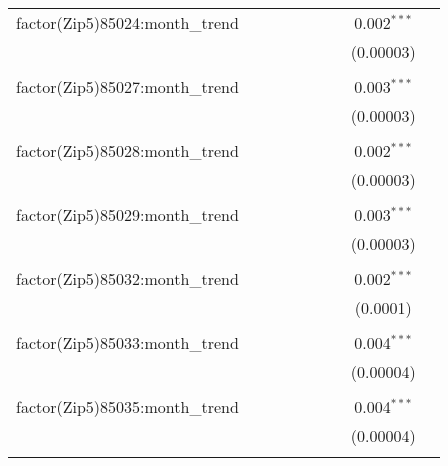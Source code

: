 \begin{table}[H]
{\begin{tabular}{@{\extracolsep{5pt}}lcccccccc}
  factor(Zip5)85024:month\_trend &  &  &  &  &  &  & 0.002$^{***}$ &  \\  

   &  &  &  &  &  &  & (0.00003) &  \\  

   & & & & & & & & \\  

  factor(Zip5)85027:month\_trend &  &  &  &  &  &  & 0.003$^{***}$ &  \\  

   &  &  &  &  &  &  & (0.00003) &  \\  

   & & & & & & & & \\  

  factor(Zip5)85028:month\_trend &  &  &  &  &  &  & 0.002$^{***}$ &  \\  

   &  &  &  &  &  &  & (0.00003) &  \\  

   & & & & & & & & \\  

  factor(Zip5)85029:month\_trend &  &  &  &  &  &  & 0.003$^{***}$ &  \\  

   &  &  &  &  &  &  & (0.00003) &  \\  

   & & & & & & & & \\  

  factor(Zip5)85032:month\_trend &  &  &  &  &  &  & 0.002$^{***}$ &  \\  

   &  &  &  &  &  &  & (0.0001) &  \\  

   & & & & & & & & \\  

  factor(Zip5)85033:month\_trend &  &  &  &  &  &  & 0.004$^{***}$ &  \\  

   &  &  &  &  &  &  & (0.00004) &  \\  

   & & & & & & & & \\  

  factor(Zip5)85035:month\_trend &  &  &  &  &  &  & 0.004$^{***}$ &  \\  

   &  &  &  &  &  &  & (0.00004) &  \\  

   & & & & & & & & \\  


\end{tabular}}
\end{table}
